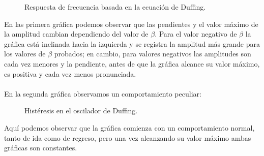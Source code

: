 \documentclass[letterpaper,12pt]{article}
\begin{document}
\begin{figure}[H]
\centering
{}
\caption{Respuesta de frecuencia basada en la ecuación de Duffing.}
\label{fig:esquema2}
\end{figure}

En las primera gráfica podemos observar que las pendientes y el valor máximo de la amplitud cambian dependiendo del valor de $\beta$. Para el valor negativo de $\beta$ la gráfica está inclinada hacia la izquierda y se registra la amplitud más grande para los valores de $\beta$ probados; en cambio, para valores negativos las amplitudes son cada vez menores y la pendiente, antes de que la gráfica alcance su valor máximo, es positiva y cada vez menos pronunciada. \\\\

En la segunda gráfica observamos un comportamiento peculiar:

\begin{figure}[H]
\centering
{}
\caption{Histéresis en el oscilador de Duffing.}
\label{fig:esquema2}
\end{figure}

Aquí podemos observar que la gráfica comienza con un comportamiento normal, tanto de ida como de regreso, pero una vez alcanzando su valor máximo ambas gráficas son constantes.
\end{document}
